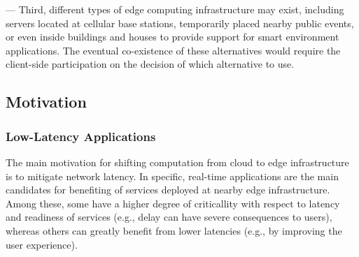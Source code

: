 
--- Third, different types of edge computing infrastructure may exist, including servers located at cellular base stations, temporarily placed nearby public events, or even inside buildings and houses to provide support for smart environment applications. The eventual co-existence of these alternatives would require the client-side participation on the decision of which alternative to use.




\subsection{Motivation}

\subsubsection{Low-Latency Applications}

The main motivation for shifting computation from cloud to edge infrastructure is to mitigate network latency. In specific, real-time applications are the main candidates for benefiting of services deployed at nearby edge infrastructure. Among these, some have a higher degree of criticallity with respect to latency and readiness of services (e.g., delay can have severe consequences to users), whereas others can greatly benefit from lower latencies (e.g., by improving the user experience).

